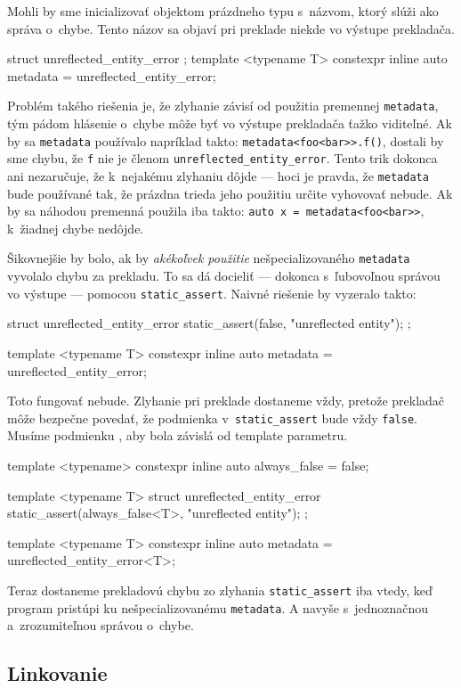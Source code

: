 Mohli by sme inicializovať objektom prázdneho typu s~názvom, ktorý slúži ako správa o~chybe. Tento názov sa objaví pri preklade niekde vo výstupe prekladača.
\begin{code}
struct unreflected_entity_error {};
template <typename T>
constexpr inline auto metadata = unreflected_entity_error{};
\end{code}
Problém takého riešenia je, že zlyhanie závisí od použitia premennej \texttt{metadata}, tým pádom hlásenie o~chybe môže byť vo výstupe prekladača ťažko viditeľné. Ak by sa \texttt{metadata} používalo napríklad takto: \texttt{metadata<foo<bar>{}>.f()}, dostali by sme chybu, že \texttt{f} nie je členom \texttt{unreflected\_entity\_error}. Tento trik dokonca ani nezaručuje, že k~nejakému zlyhaniu dôjde --- hoci je pravda, že \texttt{metadata} bude používané tak, že prázdna trieda jeho použitiu určite vyhovovať nebude. Ak by sa náhodou premenná použila iba takto: \texttt{auto x = metadata<foo<bar>{}>}, k~žiadnej chybe nedôjde.

Šikovnejšie by bolo, ak by \emph{akékoľvek použitie} nešpecializovaného \texttt{metadata} vyvolalo chybu za prekladu. To sa dá docieliť --- dokonca s~ľubovoľnou správou vo výstupe --- pomocou \texttt{static\_assert}. Naivné riešenie by vyzeralo takto:
\begin{code}
struct unreflected_entity_error
{ static_assert(false, "unreflected entity"); };

template <typename T>
constexpr inline auto metadata = unreflected_entity_error{};
\end{code}
Toto fungovať nebude. Zlyhanie pri preklade dostaneme vždy, pretože prekladač môže bezpečne povedať, že podmienka v~\texttt{static\_assert} bude vždy \texttt{false}. Musíme podmienku , aby bola závislá od template parametru.
\begin{code}
template <typename> constexpr inline auto always_false = false;

template <typename T> struct unreflected_entity_error
{ static_assert(always_false<T>, "unreflected entity"); };

template <typename T>
constexpr inline auto metadata = unreflected_entity_error<T>{};
\end{code}
Teraz dostaneme prekladovú chybu zo zlyhania \texttt{static\_assert} iba vtedy, keď program pristúpi ku nešpecializovanému \texttt{metadata}. A navyše s~jednoznačnou a~zrozumiteľnou správou o~chybe.

\subsection{Linkovanie}

